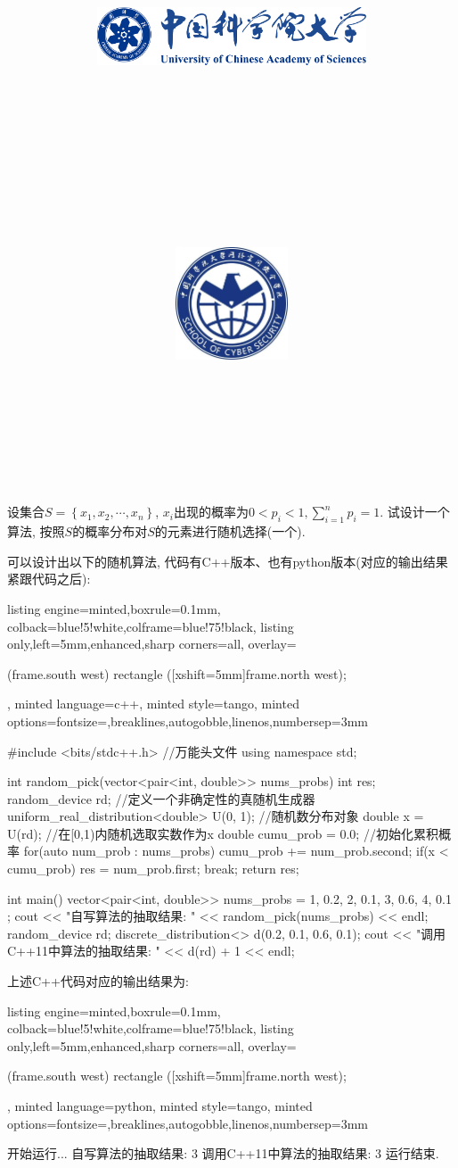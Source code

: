 \documentclass{article}
\title{
	\includegraphics[width=0.6\textwidth]{images/title/ucas_logo 1.pdf}\\
    \vspace{1in}
    \textmd{\textbf{\hmwkClass}}\\
	\textmd{\Large{\textbf{\hmwkClassID}}}\\
    \textmd{\textbf{\hmwkTitle}}\\
    \normalsize\vspace{0.1in}\large{\hmwkCompleteTime }\\
    \vspace{0.1in}\large{\textit{\hmwkClassInstructor\ }}\\
    \vspace{1in}
	\includegraphics[width=0.25\textwidth]{images/title/Cyber.jpg}\\
	\vspace{1in}
}
\author{
	\hmwkAuthorName \\ 
	\hmwkAuthorStuID \\
	\hmwkAuthorInst \\
	\hmwkAuthorzhuanye \\
	\hmwkAuthorfangxiang
	}
\date{}
\begin{document}
\maketitle


%
%
%
%
%


\pagebreak


\begin{homeworkProblem}
	设集合$S=\left\{ x_1,x_2,\cdots ,x_n \right\}$, $x_i$出现的概率为$0<p_i<1,\displaystyle \sum_{i=1}^n{p_i}=1$. 试设计一个算法, 按照$S$的概率分布对$S$的元素进行随机选择(一个).

	\solution 可以设计出以下的随机算法, 代码有C++版本、也有python版本(对应的输出结果紧跟代码之后):
\begin{tcblisting}{listing engine=minted,boxrule=0.1mm,
colback=blue!5!white,colframe=blue!75!black,
listing only,left=5mm,enhanced,sharp corners=all,
overlay={\begin{tcbclipinterior} (frame.south west)
rectangle ([xshift=5mm]frame.north west);\end{tcbclipinterior}},
minted language=c++,
minted style=tango,
minted options={fontsize=\small,breaklines,autogobble,linenos,numbersep=3mm}}
#include <bits/stdc++.h> //万能头文件
using namespace std;

int random_pick(vector<pair<int, double>> nums_probs) {
    int res;
    random_device rd; //定义一个非确定性的真随机生成器
    uniform_real_distribution<double> U(0, 1); //随机数分布对象
    double x = U(rd); //在[0,1)内随机选取实数作为x
    double cumu_prob = 0.0; //初始化累积概率
    for(auto num_prob : nums_probs) {
        cumu_prob += num_prob.second;
        if(x < cumu_prob) {
            res = num_prob.first;
            break;
        }
    }
    return res;
}

int main() {
    vector<pair<int, double>> nums_probs = {
        {1, 0.2}, {2, 0.1}, {3, 0.6}, {4, 0.1}
    };
    cout << "自写算法的抽取结果: " << random_pick(nums_probs) << endl;
    random_device rd;
    discrete_distribution<> d({0.2, 0.1, 0.6, 0.1});
    cout << "调用C++11中算法的抽取结果: " << d(rd) + 1 << endl;
}
\end{tcblisting}
上述C++代码对应的输出结果为:
\begin{tcblisting}{listing engine=minted,boxrule=0.1mm,
colback=blue!5!white,colframe=blue!75!black,
listing only,left=5mm,enhanced,sharp corners=all,
overlay={\begin{tcbclipinterior} (frame.south west)
rectangle ([xshift=5mm]frame.north west);\end{tcbclipinterior}},
minted language=python,
minted style=tango,
minted options={fontsize=\small,breaklines,autogobble,linenos,numbersep=3mm}}
开始运行...
自写算法的抽取结果: 3
调用C++11中算法的抽取结果: 3
运行结束.
\end{tcblisting}


\end{homeworkProblem}
\end{document}
